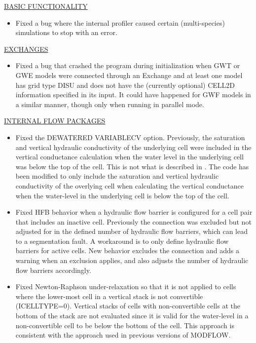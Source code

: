 \underline{BASIC FUNCTIONALITY}
\begin{itemize}
\item Fixed a bug where the internal profiler caused certain (multi-species) simulations to stop with an error.
\end{itemize}

\underline{EXCHANGES}
\begin{itemize}
\item Fixed a bug that crashed the program during initialization when GWT or GWE models were connected through an Exchange and at least one model has grid type DISU and does not have the (currently optional) CELL2D information specified in its input. It could have happened for GWF models in a similar manner, though only when running in parallel mode.
\end{itemize}

\underline{INTERNAL FLOW PACKAGES}
\begin{itemize}
\item Fixed the DEWATERED VARIABLECV option. Previously, the saturation and vertical hydraulic conductivity of the underlying cell were included in the vertical conductance calculation when the water level in the underlying cell was below the top of the cell. This is not what is described in \citet[][equation 4-44]{modflow6gwf}. The code has been modified to only include the saturation and vertical hydraulic conductivity of the overlying cell when calculating the vertical conductance when the water-level in the underlying cell is below the top of the cell.
\item Fixed HFB behavior when a hydraulic flow barrier is configured for a cell pair that includes an inactive cell. Previously the connection was excluded but not adjusted for in the defined number of hydraulic flow barriers, which can lead to a segmentation fault. A workaround is to only define hydraulic flow barriers for active cells. New behavior excludes the connection and adds a warning when an exclusion applies, and also adjusts the number of hydraulic flow barriers accordingly.
\item Fixed Newton-Raphson under-relaxation so that it is not applied to cells where the lower-most cell in a vertical stack is not convertible (ICELLTYPE=0). Vertical stacks of cells with non-convertible cells at the bottom of the stack are not evaluated since it is valid for the water-level in a non-convertible cell to be below the bottom of the cell. This approach is consistent with the approach used in previous versions of MODFLOW.
\end{itemize}


